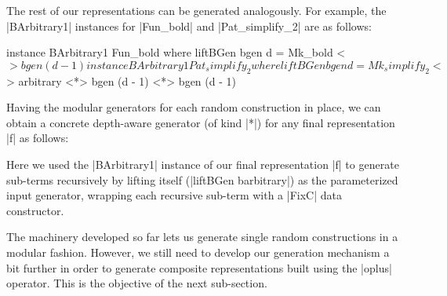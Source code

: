 The rest of our representations can be generated analogously.
%
For example, the |BArbitrary1| instances for |Fun_bold| and |Pat_simplify_2| are
as follows:

\begin{code}
instance BArbitrary1 Fun_bold where
  liftBGen bgen d = Mk_bold <$> bgen (d - 1)

instance BArbitrary1 Pat_simplify_2 where
  liftBGen bgen d = Mk_simplify_2
    <$> arbitrary <*> bgen (d - 1) <*> bgen (d - 1)
\end{code} %







Having the modular generators for each random construction in place, we can
obtain a concrete depth-aware generator (of kind |*|) for any final
representation |f| as follows:

%
Here we used the |BArbitrary1| instance of our final representation |f| to
generate sub-terms recursively by lifting itself (|liftBGen barbitrary|) as the
parameterized input generator, wrapping each recursive sub-term with a |FixC|
data constructor.

%
%
The machinery developed so far lets us generate single random constructions in a
modular fashion.
%
However, we still need to develop our generation mechanism a bit further in
order to generate composite representations built using the |oplus| operator.
%
This is the objective of the next sub-section.


